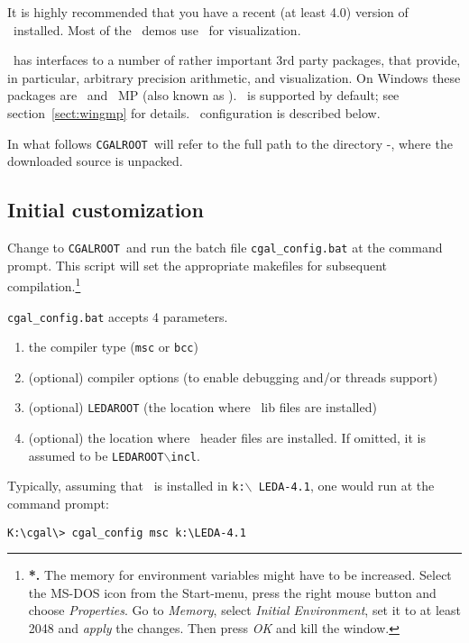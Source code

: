 It is highly recommended that you have a recent (at least 4.0) version
of \leda\ installed. Most of the \cgal\ demos use \leda\ for
visualization.

\cgal\ has interfaces to a number of rather important 3rd party
packages, that provide, in particular, arbitrary precision arithmetic,
and visualization. On Windows these packages are \leda\ and \gnu\ MP
(also known as \gmp ).  \gmp\ is supported by default; see
section~\ref{sect:wingmp} for details.  \leda\ configuration is
described below.

\newcommand{\CGALR}{\texttt{CGALROOT}}
\newcommand{\bslsh}{$\backslash$}

In what follows \CGALR\ will refer to the full path to the
directory \cgal-\cgalrelease , where the downloaded source is
unpacked.

\subsection{Initial customization}\label{subs::inicu}

Change to \CGALR\ and run the batch file \texttt{cgal\_config.bat} at the
command prompt.  This script will set the appropriate makefiles for
subsequent compilation.\footnote{
{\bf {}*.} 
The memory for environment variables might have to be increased.
Select the MS-DOS icon from the Start-menu, press the right mouse
button and choose \textit{Properties}. Go to \textit{Memory}, select
\textit{Initial Environment}, set it to at least 2048 and
\textit{apply} the changes. Then press \textit{OK} and kill the window.
}

\texttt{cgal\_config.bat} accepts 4 parameters.
\begin{enumerate}
\item the compiler type (\texttt{msc} or \texttt{bcc})
%
\item (optional) compiler options (to enable debugging and/or threads
                support)
%
\item (optional) \texttt{LEDAROOT} (the location where \leda\ lib files are installed)
%
\item (optional) the location where \leda\ header files are installed.
                If omitted, it is assumed to be 
\texttt{LEDAROOT\bslsh incl}.
\end{enumerate}

Typically, assuming that \leda\ is installed in \texttt{k:\bslsh
  LEDA-4.1}, one would run at the command prompt:
\begin{verbatim}
K:\cgal\> cgal_config msc k:\LEDA-4.1
\end{verbatim}

